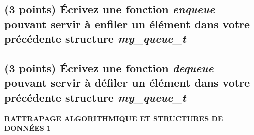 \documentclass[11pt,a4paper]{article}
\begin{document}
\bigskip

\begin{center}
\end{center}

\bigskip



\newpage

\subsection{(3 points) \'Ecrivez une fonction \og \textit{enqueue} \fg{} pouvant servir à enfiler un élément dans votre précédente structure \og \textit{my\_queue\_t} \fg{} }

\bigskip

\begin{center}

\end{center}

\newpage

\subsection{(3 points) \'Ecrivez une fonction \og \textit{dequeue} \fg{} pouvant servir à défiler un élément dans votre précédente structure \og \textit{my\_queue\_t} \fg{} }

\bigskip

\begin{center}
\end{center}

\bigskip


\clearpage



\vfillFirst

\begin{center}

\begin{LARGE}
\textbf{RATTRAPAGE ALGORITHMIQUE ET STRUCTURES DE DONN\'EES 1}
\end{LARGE}

\end{center}

\vfillLast
\end{document}
